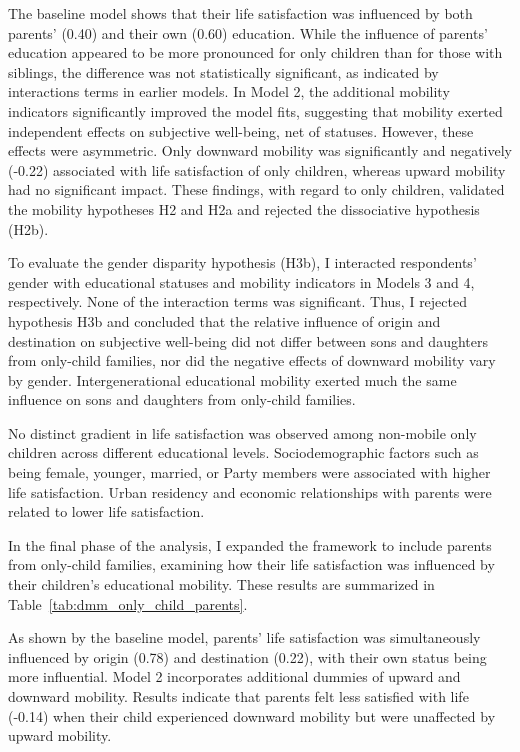 The baseline model shows that their life satisfaction was influenced by both parents' (0.40) and their own (0.60) education. While the influence of parents' education appeared to be more pronounced for only children than for those with siblings, the difference was not statistically significant, as indicated by interactions terms in earlier models. In Model 2, the additional mobility indicators significantly improved the model fits, suggesting that mobility exerted independent effects on subjective well-being, net of statuses. However, these effects were asymmetric. Only downward mobility was significantly and negatively (-0.22) associated with life satisfaction of only children, whereas upward mobility had no significant impact. These findings, with regard to only children, validated the mobility hypotheses H2 and H2a and rejected the dissociative hypothesis (H2b).

To evaluate the gender disparity hypothesis (H3b), I interacted respondents' gender with educational statuses and mobility indicators in Models 3 and 4, respectively. None of the interaction terms was significant. Thus, I rejected hypothesis H3b and concluded that the relative influence of origin and destination on subjective well-being did not differ between sons and daughters from only-child families, nor did the negative effects of downward mobility vary by gender. Intergenerational educational mobility exerted much the same influence on sons and daughters from only-child families.

No distinct gradient in life satisfaction was observed among non-mobile only children across different educational levels. Sociodemographic factors such as being female, younger, married, or Party members were associated with higher life satisfaction. Urban residency and economic relationships with parents were related to lower life satisfaction.

In the final phase of the analysis, I expanded the framework to include parents from only-child families, examining how their life satisfaction was influenced by their children's educational mobility. These results are summarized in Table~\ref{tab:dmm_only_child_parents}.

As shown by the baseline model, parents' life satisfaction was simultaneously influenced by origin (0.78) and destination (0.22), with their own status being more influential. Model 2 incorporates additional dummies of upward and downward mobility. Results indicate that parents felt less satisfied with life (-0.14) when their child experienced downward mobility but were unaffected by upward mobility.

